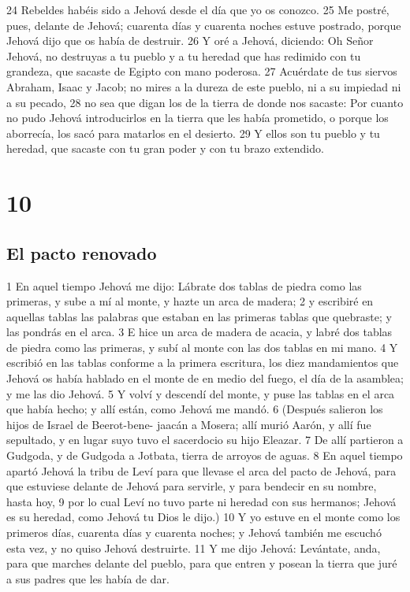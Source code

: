 24 Rebeldes habéis sido a Jehová desde el día que yo os conozco.
25 Me postré, pues, delante de Jehová; cuarenta días y cuarenta noches estuve postrado, porque Jehová dijo que os había de destruir.
26 Y oré a Jehová, diciendo: Oh Señor Jehová, no destruyas a tu pueblo y a tu heredad que has redimido con tu grandeza, que sacaste de Egipto con mano poderosa.
27 Acuérdate de tus siervos Abraham, Isaac y Jacob; no mires a la dureza de este pueblo, ni a su impiedad ni a su pecado,
28 no sea que digan los de la tierra de donde nos sacaste: Por cuanto no pudo Jehová introducirlos en la tierra que les había prometido, o porque los aborrecía, los sacó para matarlos en el desierto.
29 Y ellos son tu pueblo y tu heredad, que sacaste con tu gran poder y con tu brazo extendido.

\chapter{10}


\section{El pacto renovado}


1 En aquel tiempo Jehová me dijo: Lábrate dos tablas de piedra como las primeras, y sube a mí al monte, y hazte un arca de madera;
2 y escribiré en aquellas tablas las palabras que estaban en las primeras tablas que quebraste; y las pondrás en el arca.
3 E hice un arca de madera de acacia, y labré dos tablas de piedra como las primeras, y subí al monte con las dos tablas en mi mano.
4 Y escribió en las tablas conforme a la primera escritura, los diez mandamientos que Jehová os había hablado en el monte de en medio del fuego, el día de la asamblea; y me las dio Jehová.
5 Y volví y descendí del monte, y puse las tablas en el arca que había hecho; y allí están, como Jehová me mandó.
6 (Después salieron los hijos de Israel de Beerot-bene- jaacán a Mosera; allí murió Aarón, y allí fue sepultado, y en lugar suyo tuvo el sacerdocio su hijo Eleazar.
7 De allí partieron a Gudgoda, y de Gudgoda a Jotbata, tierra de arroyos de aguas.
8 En aquel tiempo apartó Jehová la tribu de Leví  para que llevase el arca del pacto de Jehová, para que estuviese delante de Jehová para servirle, y para bendecir en su nombre, hasta hoy,
9 por lo cual Leví no tuvo parte ni heredad con sus hermanos; Jehová es su heredad, como Jehová tu Dios le dijo.)
10 Y yo estuve en el monte como los primeros días, cuarenta días y cuarenta noches; y Jehová también me escuchó esta vez, y no quiso Jehová destruirte.
11 Y me dijo Jehová: Levántate, anda, para que marches delante del pueblo, para que entren y posean la tierra que juré a sus padres que les había de dar.


